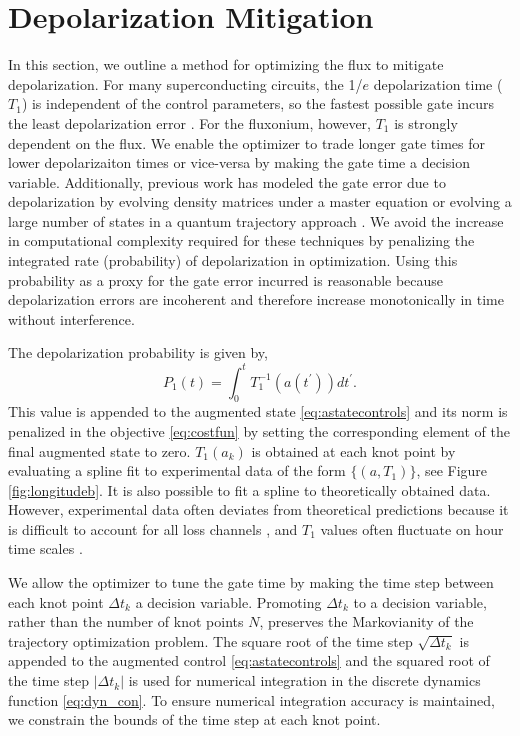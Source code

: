\section{Depolarization Mitigation\label{sec:longitude}}
In this section, we outline a method
for optimizing the flux to mitigate depolarization.
For many superconducting circuits, the 1/$e$ depolarization time ($T_{1}$) is independent of the control parameters,
so the fastest possible gate incurs the least depolarization error
\cite{schulteherbruggen2011optimal}.
For the fluxonium, however, $T_{1}$ is strongly dependent on the flux.
We enable the optimizer to trade longer gate times
for lower depolarizaiton times or vice-versa by making the gate time a decision variable.
Additionally, previous work has modeled the gate error due to depolarization
by evolving density matrices under a master
equation \cite{rembold2020introduction, schulteherbruggen2011optimal}
or evolving a large number of states in a quantum trajectory approach
\cite{abdelhafez2019gradient}.
We avoid the increase in computational complexity required for these
techniques by penalizing the integrated rate (probability) of depolarization in optimization.
Using this probability as a proxy for the gate error incurred
is reasonable because depolarization errors are incoherent and therefore
increase monotonically in time without interference.

The depolarization probability is given by,
\begin{equation}
  P_{1}(t) = \int_{0}^{t} T_{1}^{-1}(a(t^{\prime})) dt^{\prime}.
\end{equation}
This value is appended to the augmented state \eqref{eq:astatecontrols}
and its norm is penalized in the objective \eqref{eq:costfun} by setting
the corresponding element of the final augmented state to zero.
$T_{1}(a_{k})$ is obtained at each knot point by evaluating
a spline fit to experimental data of the form $\{(a, T_{1})\}$,
see Figure \ref{fig:longitudeb}.
It is also possible to fit a spline to theoretically obtained data.
However, experimental data often deviates from theoretical predictions
because it is difficult to account for all loss channels \cite{zhang2020universal},
and $T_{1}$ values often fluctuate on hour
time scales \cite{klimov2018fluctuations}.

We allow the optimizer to tune the gate time by
making the time step between each knot point $\Delta t_{k}$
a decision variable. Promoting $\Delta t_{k}$ to a decision variable, rather
than the number of knot points $N$, preserves the
Markovianity of the trajectory
optimization problem. The square root of the time step $\sqrt{\Delta t_{k}}$
is appended to the augmented control \eqref{eq:astatecontrols}
and the squared root
of the time step $\lvert \Delta t_{k} \rvert$ is used
for numerical integration in the discrete dynamics function \eqref{eq:dyn_con}.
To ensure numerical
integration accuracy is maintained, we constrain
the bounds of the time step at each knot point.


